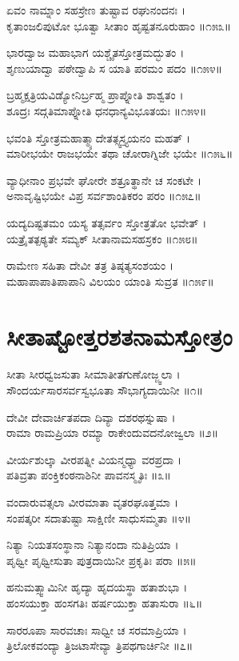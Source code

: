 ಏವಂ ನಾಮ್ನಾಂ ಸಹಸ್ರೇಣ ತುಷ್ಟಾವ ರಘುನಂದನಃ ।\\
ಕೃತಾಂಜಲಿಪುಟೋ ಭೂತ್ವಾ ಸೀತಾಂ ಹೃಷ್ಟತನೂರುಹಾಂ ॥೧೫೩॥

ಭಾರದ್ವಾಜ ಮಹಾಭಾಗ ಯಶ್ಚೈತಸ್ತೋತ್ರಮದ್ಭುತಂ ।\\
ಶೃಣುಯಾದ್ವಾ ಪಠೇದ್ವಾಪಿ ಸ ಯಾತಿ ಪರಮಂ ಪದಂ ॥೧೫೪॥

ಬ್ರಹ್ಮಕ್ಷತ್ರಿಯವಿಡ್ಯೋನಿರ್ಬ್ರಹ್ಮ ಪ್ರಾಪ್ನೋತಿ ಶಾಶ್ವತಂ ।\\
ಶೂದ್ರಃ ಸದ್ಗತಿಮಾಪ್ನೋತಿ ಧನಧಾನ್ಯವಿಭೂತಯಃ ॥೧೫೪॥

ಭವಂತಿ ಸ್ತೋತ್ರಮಹಾತ್ಮ್ಯಾದೇತತ್ಸ್ವಸ್ತ್ಯಯನಂ ಮಹತ್ ।\\
ಮಾರೀಭಯೇ ರಾಜಭಯೇ ತಥಾ ಚೋರಾಗ್ನಿಜೇ ಭಯೇ ॥೧೫೬॥

ವ್ಯಾಧೀನಾಂ ಪ್ರಭವೇ ಘೋರೇ ಶತ್ರೂತ್ಥಾನೇ ಚ ಸಂಕಟೇ ।\\
ಅನಾವೃಷ್ಟಿಭಯೇ ವಿಪ್ರ ಸರ್ವಶಾಂತಿಕರಂ ಪರಂ ॥೧೫೭॥

ಯದ್ಯದಿಷ್ಟತಮಂ ಯಸ್ಯ ತತ್ಸರ್ವಂ ಸ್ತೋತ್ರತೋ ಭವೇತ್ ।\\
ಯತ್ರೈತತ್ಪಠ್ಯತೇ ಸಮ್ಯಕ್ ಸೀತಾನಾಮಸಹಸ್ರಕಂ ॥೧೫೮॥

ರಾಮೇಣ ಸಹಿತಾ ದೇವೀ ತತ್ರ ತಿಷ್ಠತ್ಯಸಂಶಯಂ ।\\
ಮಹಾಪಾಪಾತಿಪಾಪಾನಿ ವಿಲಯಂ ಯಾಂತಿ ಸುವ್ರತ ॥೧೫೯॥
\section{ಸೀತಾಷ್ಟೋತ್ತರಶತನಾಮಸ್ತೋತ್ರಂ}
ಸೀತಾ ಸೀರಧ್ವಜಸುತಾ ಸೀಮಾತೀತಗುಣೋಜ್ಜ್ವಲಾ ।\\
ಸೌಂದರ್ಯಸಾರಸರ್ವಸ್ವಭೂತಾ ಸೌಭಾಗ್ಯದಾಯಿನೀ ॥೧॥

ದೇವೀ ದೇವಾರ್ಚಿತಪದಾ ದಿವ್ಯಾ ದಶರಥಸ್ನುಷಾ ।\\
ರಾಮಾ ರಾಮಪ್ರಿಯಾ ರಮ್ಯಾ ರಾಕೇಂದುವದನೋಜ್ವಲಾ ॥೨॥

ವೀರ್ಯಶುಲ್ಕಾ ವೀರಪತ್ನೀ ವಿಯನ್ಮಧ್ಯಾ ವರಪ್ರದಾ ।\\
ಪತಿವ್ರತಾ ಪಂಕ್ತಿಕಂಠನಾಶಿನೀ ಪಾವನಸ್ಮೃತಿಃ ॥೩॥

ವಂದಾರುವತ್ಸಲಾ ವೀರಮಾತಾ ವೃತರಘೂತ್ತಮಾ ।\\
ಸಂಪತ್ಕರೀ ಸದಾತುಷ್ಟಾ ಸಾಕ್ಷಿಣೀ ಸಾಧುಸಮ್ಮತಾ ॥೪॥

ನಿತ್ಯಾ ನಿಯತಸಂಸ್ಥಾನಾ ನಿತ್ಯಾನಂದಾ ನುತಿಪ್ರಿಯಾ ।\\
ಪೃಥ್ವೀ ಪೃಥ್ವೀಸುತಾ ಪುತ್ರದಾಯಿನೀ ಪ್ರಕೃತಿಃ ಪರಾ ॥೫॥

ಹನುಮತ್ಸ್ವಾಮಿನೀ ಹೃದ್ಯಾ ಹೃದಯಸ್ಥಾ ಹತಾಶುಭಾ ।\\
ಹಂಸಯುಕ್ತಾ ಹಂಸಗತಿಃ ಹರ್ಷಯುಕ್ತಾ ಹತಾಸುರಾ ॥೬॥

ಸಾರರೂಪಾ ಸಾರವಚಾಃ ಸಾಧ್ವೀ ಚ ಸರಮಾಪ್ರಿಯಾ ।\\
ತ್ರಿಲೋಕವಂದ್ಯಾ ತ್ರಿಜಟಾಸೇವ್ಯಾ ತ್ರಿಪಥಗಾರ್ಚಿನೀ ॥೭॥

